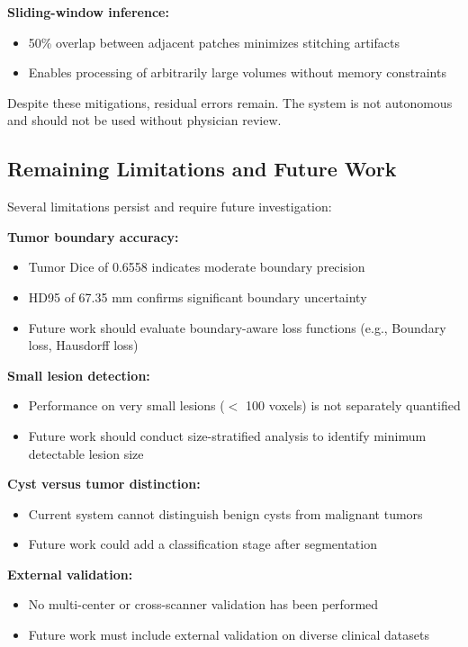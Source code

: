 \textbf{Sliding-window inference:}
\begin{itemize}
    \item 50\% overlap between adjacent patches minimizes stitching artifacts
    \item Enables processing of arbitrarily large volumes without memory constraints
\end{itemize}

Despite these mitigations, residual errors remain. The system is not autonomous and should not be used without physician review.

\subsection{Remaining Limitations and Future Work}

Several limitations persist and require future investigation:

\textbf{Tumor boundary accuracy:}
\begin{itemize}
    \item Tumor Dice of 0.6558 indicates moderate boundary precision
    \item HD95 of 67.35 mm confirms significant boundary uncertainty
    \item Future work should evaluate boundary-aware loss functions (e.g., Boundary loss, Hausdorff loss)
\end{itemize}

\textbf{Small lesion detection:}
\begin{itemize}
    \item Performance on very small lesions ($<$ 100 voxels) is not separately quantified
    \item Future work should conduct size-stratified analysis to identify minimum detectable lesion size
\end{itemize}

\textbf{Cyst versus tumor distinction:}
\begin{itemize}
    \item Current system cannot distinguish benign cysts from malignant tumors
    \item Future work could add a classification stage after segmentation
\end{itemize}

\textbf{External validation:}
\begin{itemize}
    \item No multi-center or cross-scanner validation has been performed
    \item Future work must include external validation on diverse clinical datasets
\end{itemize}

